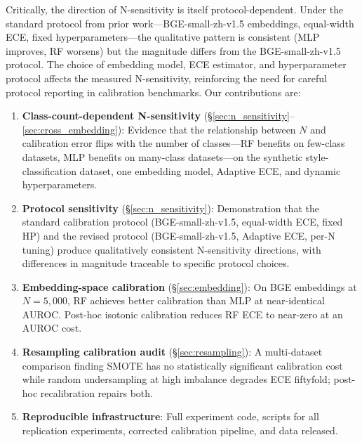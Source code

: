 \documentclass[11pt]{article}
\begin{document}
Critically, the direction of N-sensitivity is itself protocol-dependent. Under the standard protocol from prior work---BGE-small-zh-v1.5 embeddings, equal-width ECE, fixed hyperparameters---the qualitative pattern is consistent (MLP improves, RF worsens) but the magnitude differs from the BGE-small-zh-v1.5 protocol. The choice of embedding model, ECE estimator, and hyperparameter protocol affects the measured N-sensitivity, reinforcing the need for careful protocol reporting in calibration benchmarks. Our contributions are:

\begin{enumerate}[leftmargin=*,nosep]
 \item \textbf{Class-count-dependent N-sensitivity} (§\ref{sec:n_sensitivity}--\ref{sec:cross_embedding}): Evidence that the relationship between $N$ and calibration error flips with the number of classes---RF benefits on few-class datasets, MLP benefits on many-class datasets---on the synthetic style-classification dataset, one embedding model, Adaptive ECE, and dynamic hyperparameters.
 \item \textbf{Protocol sensitivity} (§\ref{sec:n_sensitivity}): Demonstration that the standard calibration protocol (BGE-small-zh-v1.5, equal-width ECE, fixed HP) and the revised protocol (BGE-small-zh-v1.5, Adaptive ECE, per-N tuning) produce qualitatively consistent N-sensitivity directions, with differences in magnitude traceable to specific protocol choices.
 \item \textbf{Embedding-space calibration} (§\ref{sec:embedding}): On BGE embeddings at $N=5{,}000$, RF achieves better calibration than MLP at near-identical AUROC. Post-hoc isotonic calibration reduces RF ECE to near-zero at an AUROC cost.
 \item \textbf{Resampling calibration audit} (§\ref{sec:resampling}): A multi-dataset comparison finding SMOTE has no statistically significant calibration cost while random undersampling at high imbalance degrades ECE fiftyfold; post-hoc recalibration repairs both.
 \item \textbf{Reproducible infrastructure}: Full experiment code, scripts for all replication experiments, corrected calibration pipeline, and data released.
\end{enumerate}
\end{document}
